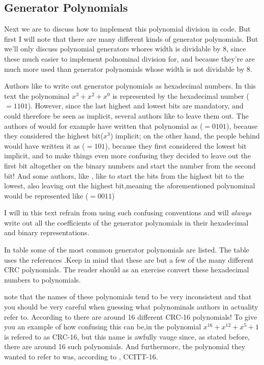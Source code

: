 \subsection{Generator Polynomials}

Next we are to discuss how to implement this polynomial division in
code. But first I will note that there are many different kinds of
generator polynomials. But we'll only discuss polynomial generators
whores width is dividable by 8, since these much easier to implement
polnominal division for, and because they're are much more used than
generator polynomials whose width is not dividable by $8$.

Authors like to write out generator polynomials as hexadecimal
numbers. In this text the polynominal $x^3 + x^2 + x^0$ is represented
by the hexadecimal number ($=1101$). However, since the last
highest and lowest bits are mandatory, and could therefore be seen as
implicit, several authors like to leave them out. The authors of
\cite{press2007numerical_recipes} would for example have written that
polynomial as ($=0101$), because they considered the highest
bit($x^{3}$) implicit; on the other hand, the people behind
\cite{Koopman04cyclicredundancy_embedded_networks} would have written
it as ($=101$), because they first considered the lowest bit
implicit, and to make things even more confusing they decided to leave
out the first bit altogether on the binary numbers and start the
number from the second bit! And some authors, like
\cite{boutel:_png_portab_networ_graph_specif_version12}, like to start
the bits from the highest bit to the lowest, also leaving out the
highest bit,meaning the aforementioned polynominal would be
represented like ($=0011$)

I will in this text refrain from using such confusing conventions and
will \textit{always} write out all the coefficients of the generator
polynomials in their hexadecimal and binary representations.

In table \cite{Koopman04cyclicredundancy_embedded_networks} some of
the most common generator polynomials are listed. The table uses the
references
\cite{cook:_catal_crc,Koopman04cyclicredundancy_embedded_networks,press2007numerical_recipes,Ramabadran:1988:TCC:623224.623360_crc_tutorial,boutel:_png_portab_networ_graph_specif_version12}.Keep
in mind that these are but a few of the many different CRC
polynomials. The reader should as an exercise convert these
hexadecimal numbers to polynomials.

note that the names of these polynomials tend to be very inconsistent
and that you should be very careful when guessing what polynominals
authors in actuality refer to. According to \cite{cook:_catal_crc}
there are around 16 different CRC-16 polynomials! To give you an
example of how confusing this can be,in
\cite{inc05:_epctm_radio_frequen_ident_protoc} the polynomial $x^{16}
+ x^{12} + x^5 + 1$ is refered to as CRC-16, but this name is awfully
vauge since, as stated before, there are around 16 such
polynomials. And furthermore, the polynomial they wanted to refer to
was, according to
\cite{cook:_catal_crc,Koopman04cyclicredundancy_embedded_networks},
CCITT-16.

